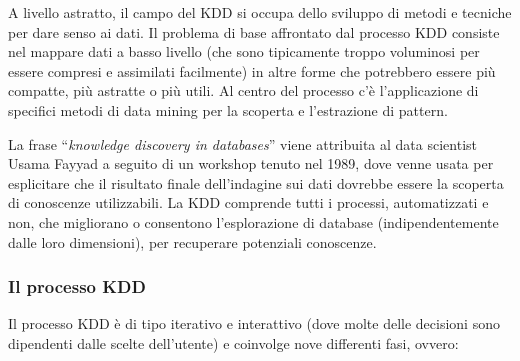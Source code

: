 A livello astratto, il campo del KDD si occupa dello sviluppo di metodi e tecniche per dare senso ai dati. Il problema di base affrontato dal processo KDD consiste nel mappare dati a basso livello (che sono tipicamente troppo voluminosi per essere compresi e assimilati facilmente) in altre forme che potrebbero essere più compatte, più astratte o più utili. Al centro del processo c’è l’applicazione di specifici metodi di data mining per la scoperta e l’estrazione di pattern.\cite{from_data_mining_to_knowledge_discovery}

La frase “\textit{knowledge discovery in databases}” viene attribuita al data scientist Usama Fayyad a seguito di un workshop tenuto nel 1989, dove venne usata per esplicitare che il risultato finale dell’indagine sui dati dovrebbe essere la scoperta di conoscenze utilizzabili. La KDD comprende tutti i processi, automatizzati e non, che migliorano o consentono l’esplorazione di database (indipendentemente dalle loro dimensioni), per recuperare potenziali conoscenze.\cite{knowledge_discovery_in_databases}

\subsubsection{Il processo KDD}

Il processo KDD è di tipo iterativo e interattivo (dove molte delle decisioni sono dipendenti dalle scelte dell’utente) e coinvolge nove differenti fasi, ovvero:\cite{researchgate_data_mining_and_knowledge}

